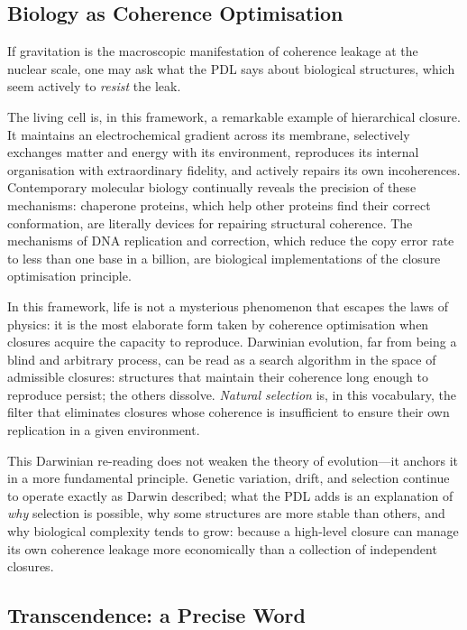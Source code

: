 \documentclass[12pt, a4paper, openright]{book}
\begin{document}
\subsection*{Biology as Coherence Optimisation}

If gravitation is the macroscopic manifestation of coherence leakage at the nuclear scale, one may ask what the PDL says about biological structures, which seem actively to \emph{resist} the leak.

\medskip

The living cell is, in this framework, a remarkable example of hierarchical closure. It maintains an electrochemical gradient across its membrane, selectively exchanges matter and energy with its environment, reproduces its internal organisation with extraordinary fidelity, and actively repairs its own incoherences. Contemporary molecular biology continually reveals the precision of these mechanisms: chaperone proteins, which help other proteins find their correct conformation, are literally devices for repairing structural coherence. The mechanisms of DNA replication and correction, which reduce the copy error rate to less than one base in a billion, are biological implementations of the closure optimisation principle.

\medskip

In this framework, life is not a mysterious phenomenon that escapes the laws of physics: it is the most elaborate form taken by coherence optimisation when closures acquire the capacity to reproduce. Darwinian evolution, far from being a blind and arbitrary process, can be read as a search algorithm in the space of admissible closures: structures that maintain their coherence long enough to reproduce persist; the others dissolve. \emph{Natural selection} is, in this vocabulary, the filter that eliminates closures whose coherence is insufficient to ensure their own replication in a given environment.

\medskip

This Darwinian re-reading does not weaken the theory of evolution---it anchors it in a more fundamental principle. Genetic variation, drift, and selection continue to operate exactly as Darwin described; what the PDL adds is an explanation of \emph{why} selection is possible, why some structures are more stable than others, and why biological complexity tends to grow: because a high-level closure can manage its own coherence leakage more economically than a collection of independent closures.

\subsection*{Transcendence: a Precise Word}
\end{document}
